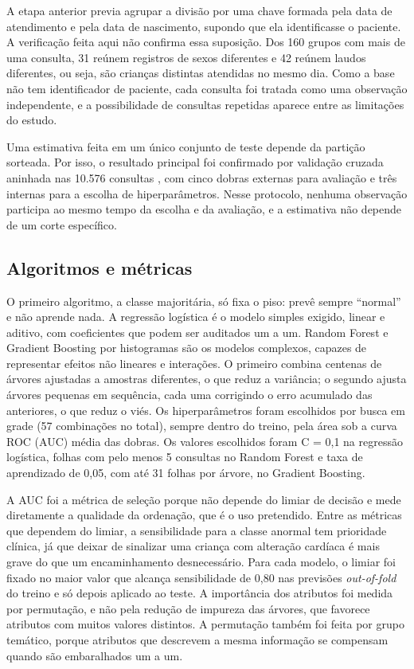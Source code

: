 \documentclass[conference]{IEEEtran}
\begin{document}
A etapa anterior previa agrupar a divisão por uma chave formada pela data de atendimento e pela data de nascimento, supondo que ela identificasse o paciente. A verificação feita aqui não confirma essa suposição. Dos 160 grupos com mais de uma consulta, 31 reúnem registros de sexos diferentes e 42 reúnem laudos diferentes, ou seja, são crianças distintas atendidas no mesmo dia. Como a base não tem identificador de paciente, cada consulta foi tratada como uma observação independente, e a possibilidade de consultas repetidas aparece entre as limitações do estudo.

Uma estimativa feita em um único conjunto de teste depende da partição sorteada. Por isso, o resultado principal foi confirmado por validação cruzada aninhada nas 10.576 consultas \cite{varma}, com cinco dobras externas para avaliação e três internas para a escolha de hiperparâmetros. Nesse protocolo, nenhuma observação participa ao mesmo tempo da escolha e da avaliação, e a estimativa não depende de um corte específico.

\subsection{Algoritmos e métricas}
O primeiro algoritmo, a classe majoritária, só fixa o piso: prevê sempre ``normal'' e não aprende nada. A regressão logística é o modelo simples exigido, linear e aditivo, com coeficientes que podem ser auditados um a um. Random Forest \cite{breiman} e Gradient Boosting por histogramas \cite{friedman} são os modelos complexos, capazes de representar efeitos não lineares e interações. O primeiro combina centenas de árvores ajustadas a amostras diferentes, o que reduz a variância; o segundo ajusta árvores pequenas em sequência, cada uma corrigindo o erro acumulado das anteriores, o que reduz o viés. Os hiperparâmetros foram escolhidos por busca em grade (57 combinações no total), sempre dentro do treino, pela área sob a curva ROC (AUC) média das dobras. Os valores escolhidos foram C = 0,1 na regressão logística, folhas com pelo menos 5 consultas no Random Forest e taxa de aprendizado de 0,05, com até 31 folhas por árvore, no Gradient Boosting.

A AUC foi a métrica de seleção porque não depende do limiar de decisão e mede diretamente a qualidade da ordenação, que é o uso pretendido. Entre as métricas que dependem do limiar, a sensibilidade para a classe anormal tem prioridade clínica, já que deixar de sinalizar uma criança com alteração cardíaca é mais grave do que um encaminhamento desnecessário. Para cada modelo, o limiar foi fixado no maior valor que alcança sensibilidade de 0,80 nas previsões \textit{out-of-fold} do treino e só depois aplicado ao teste. A importância dos atributos foi medida por permutação, e não pela redução de impureza das árvores, que favorece atributos com muitos valores distintos. A permutação também foi feita por grupo temático, porque atributos que descrevem a mesma informação se compensam quando são embaralhados um a um.
\end{document}
